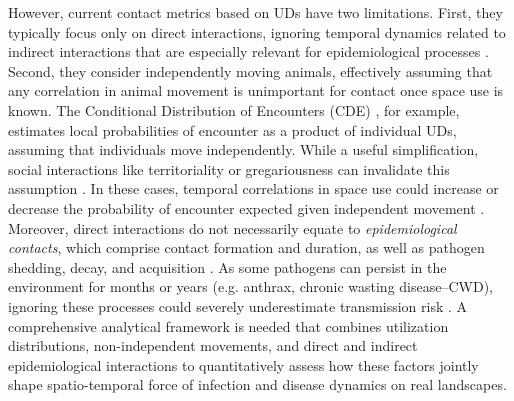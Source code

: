 \documentclass[letterpaper]{article}
\begin{document}
However, current contact metrics based on UDs have two limitations. First, they typically focus only on direct interactions, ignoring temporal dynamics related to indirect interactions that are especially relevant for epidemiological processes \citep{Yang2023}. Second, they consider independently moving animals, effectively assuming that any correlation in animal movement is unimportant for contact once space use is known. The Conditional Distribution of Encounters (CDE) \citep{Noonan2021}, for example, estimates local probabilities of encounter as a product of individual UDs, assuming that individuals move independently.
While a useful simplification, social interactions like territoriality or gregariousness can invalidate this assumption \citep{Manlove2018,Sah2018}. In these cases, temporal correlations in space use could increase or decrease the probability of encounter expected given independent movement \citep{Kjaer2008,Schauber2015a}. 
Moreover, direct interactions do not necessarily equate to \emph{epidemiological contacts}, which comprise contact formation and duration, as well as pathogen shedding, decay, and acquisition \citep{Herraiz2024}. As some pathogens can persist in the environment for months or years (e.g. anthrax, chronic wasting disease--CWD), ignoring these processes could severely underestimate transmission risk \citep{Wilber2022,Yang2023,Richardson2015}.  A comprehensive analytical framework is needed that combines utilization distributions, non-independent movements, and direct and indirect epidemiological interactions to quantitatively assess how these factors jointly shape spatio-temporal force of infection and disease dynamics on real landscapes.

\end{document}
